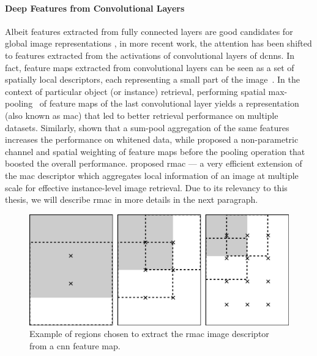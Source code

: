 \paragraph{Deep Features from Convolutional Layers}
Albeit features extracted from fully connected layers are good candidates for global image representations%
, in more recent work, the attention has been shifted to features extracted from the activations of convolutional layers of \glspl{dcnn}.
In fact, feature maps extracted from convolutional layers can be seen as a set of spatially local descriptors, each representing a small part of the image~\cite{liu2015treasure}.
In the context of particular object (or instance) retrieval, performing spatial max-pooling~\cite{azizpour2015generic,razavian2016visual} of feature maps of the last convolutional layer yields a representation (also known as \gls{mac}) that led to better retrieval performance on multiple datasets.
Similarly, \citet{babenko2015aggregating} shown that a sum-pool aggregation of the same features increases the performance on whitened data, while \citet{kalantidis2016cross} proposed a non-parametric channel and spatial weighting of feature maps before the pooling operation that boosted the overall performance.
\citet{tolias2016rmac} proposed \gls{rmac} --- a very efficient extension of the \gls{mac} descriptor which aggregates local information of an image at multiple scale for effective instance-level image retrieval.
Due to its relevancy to this thesis, we will describe \gls{rmac} in more details in the next paragraph.

\begin{figure}
    \centering
    \includegraphics[width=0.6\linewidth]{rmac-regions}
    \caption{Example of regions chosen to extract the \gls{rmac} image descriptor from a \gls{cnn} feature map. }
    \label{fig:back:rmac-regions}
\end{figure}

